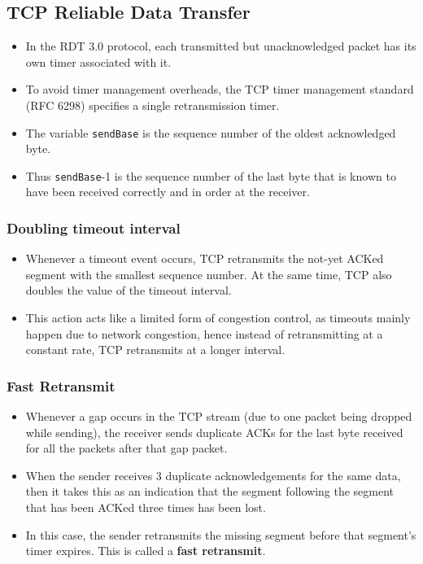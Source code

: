 \documentclass{article}
\theoremstyle{plain}
\theoremstyle{definition}
\begin{document}
\subsection{TCP Reliable Data Transfer}
\begin{itemize}
    \item In the RDT 3.0 protocol, each transmitted but unacknowledged packet has its own timer associated with it.
    
    \item To avoid timer management overheads, the TCP timer management standard (RFC 6298) specifies a single retransmission timer. 
    
    \item The variable \texttt{sendBase} is the sequence number of the oldest acknowledged byte.
    
    \item Thus \texttt{sendBase}-1 is the sequence number of the last byte that is known to have been received correctly and in order at the receiver.
\end{itemize}

\subsubsection{Doubling timeout interval}
\begin{itemize}
    \item Whenever a timeout event occurs, TCP retransmits the not-yet ACKed segment with the smallest sequence number. At the same time, TCP also doubles the value of the timeout interval. 
    
    \item This action acts like a limited form of congestion control, as timeouts mainly happen due to network congestion, hence instead of retransmitting at a constant rate, TCP retransmits at a longer interval. 
\end{itemize}

\subsubsection{Fast Retransmit}
\begin{itemize}
    \item Whenever a gap occurs in the TCP stream (due to one packet being dropped while sending), the receiver sends duplicate ACKs for the last byte received for all the packets after that gap packet.
    
    \item When the sender receives 3 duplicate acknowledgements for the same data, then it takes this as an indication that the segment following the segment that has been ACKed three times has been lost.
    
    \item In this case, the sender retransmits the missing segment before that segment’s timer expires. This is called a \textbf{fast retransmit}. 
\end{itemize}
\end{document}
